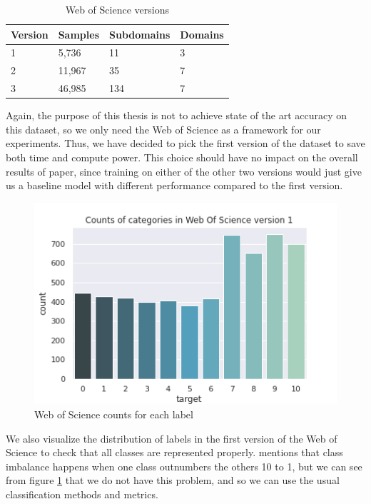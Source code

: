 \documentclass[12pt]{extreport}
\begin{document}
\begin{table}[ht!]
\centering
\begin{tabular}{|l|l|l|l|}
\hline
Version & Samples & Subdomains & Domains \\ \hline
1       & 5,736   & 11         & 3       \\ \hline
2       & 11,967  & 35         & 7       \\ \hline
3       & 46,985  & 134        & 7       \\ \hline
\end{tabular}
\caption{Web of Science versions}
\label{table:wos}
\end{table}

Again, the purpose of this thesis is not to achieve state of the art accuracy on this dataset, so we only need the Web of Science as a framework for our experiments. Thus, we have decided to pick the first version of the dataset to save both time and compute power. This choice should have no impact on the overall results of paper, since training on either of the other two versions would just give us a baseline model with different performance compared to the first version.

\begin{figure}[ht!]
\centering
\includegraphics[width=0.8\linewidth]{assets/framework/wos_counts_1.png}
\caption{Web of Science counts for each label}
\label{fig:wos-1}
\end{figure}

We also visualize the distribution of labels in the first version of the Web of Science to check that all classes are represented properly. \cite{classimbalance} mentions that class imbalance happens when one class outnumbers the others 10 to 1, but we can see from figure \ref{fig:wos-1} that we do not have this problem, and so we can use the usual classification methods and metrics.
\end{document}

